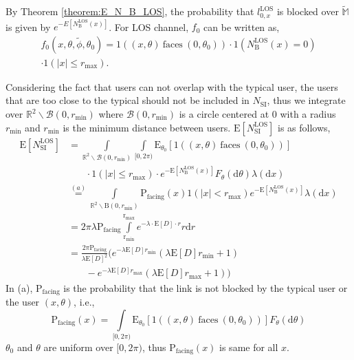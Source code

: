 \documentclass[10pt, conference, letterpaper]{IEEEtran}
\begin{document}
By Theorem \ref{theorem:E_N_B_LOS}, the probability that $l_{0,x}^{\mathrm{LOS}}$ is blocked over $\mathbb{\tilde{M}}$ is given by $e^{-E[N_\mathrm{B}^\mathrm{LOS}(x)]}$. For LOS channel, $f_0$ can be written as, 
\begin{multline}\label{eq:f0_LOS}
	f_0(x,\theta, \tilde{\phi},\theta_0)=\text{1}((x,\theta)\mathrm{~faces~}(0,\theta_0))\cdot\mathrm{1}(N_\mathrm{B}^\mathrm{LOS}(x)=0) \\
	\cdot\text{1}(|x|\leq r_{\max}). 
\end{multline}

Considering the fact that users can not overlap with the typical user, the users that are too close to the typical should not be included in $N_{\mathrm{SI}}$, thus we integrate over $\mathbb{R}^2\backslash{\mathcal{B}(0, r_{\min})}$ where $\mathcal{B}(0, r_{\min})$ is a circle centered at $0$ with a radius $r_{\min}$ and $r_{\min}$ is the minimum distance between users. 
$\mathrm{E}[N_{\mathrm{SI}}^{\text{LOS}}]$ is as follows, 
\begin{equation}
\begin{aligned}
\mathrm{E}[N_{\mathrm{SI}}^{\text{LOS}}] &= \int\limits_{\mathbb{R}^2\backslash\mathcal{B}(0,r_{\text{min}})} \int\limits_{[0,2\pi)}\mathrm{E}_{\theta_0}[\text{1}((x,\theta)\mathrm{~faces~}(0,\theta_0))]\\
& \phantom{{}=1} \cdot\text{1}(|x|\leq r_{\max})\cdot e^{-\mathrm{E}[N_{\mathrm{B}}^\mathrm{LOS}(x)]}F_{\theta}(\mathrm{d}\theta)\lambda(\mathrm{d}x)\\
& \stackrel{(a)} = \int\limits_{\mathbb{R}^2\backslash\mathrm{B}(0,r_{\text{min}})}
\mathrm{P}_{\text{facing}}(x)\text{1}(|x|<r_{\text{max}})e^{-\mathrm{E}[N_{\mathrm{B}}^\mathrm{LOS}(x)]}\lambda(\mathrm{d}x)\\
& = 2\pi\lambda \mathrm{P}_{\text{facing}}\int\limits_{\mathrm{r_{min}}}^{\mathrm{r_{max}}}e^{-\lambda\cdot\mathrm{E}[D]\cdot r}r\mathrm{d}r\\
& =\frac{2\pi \mathrm{P}_{\text{facing}}}{\lambda \mathrm{E}[D]^2}\big( e^{-\lambda\mathrm{E}[D]r_{\mathrm{min}}}(\lambda\mathrm{E}[D]r_{\mathrm{min}} + 1)\\
& \phantom{{}=1} - e^{-\lambda\mathrm{E}[D]r_{\mathrm{max}}}(\lambda\mathrm{E}[D]r_{\mathrm{max}} + 1)\big)
\end{aligned} 
\end{equation}
In (a), $\mathrm{P}_{\text{facing}}$ is the probability that the link is not blocked by the typical user or the user $(x,\theta)$, i.e.,
\begin{equation*}
\mathrm{P}_{\text{facing}}(x) = \int\limits_{[0,2\pi)}\mathrm{E}_{\theta_0}[\text{1}((x,\theta)\mathrm{~faces~}(0,\theta_0))]F_{\theta}(\mathrm{d}\theta)
\end{equation*}
$\theta_0$ and $\theta$ are uniform over $[0, 2\pi)$, thus $\mathrm{P}_{\text{facing}}(x)$ is same for all $x$.
\end{document}
